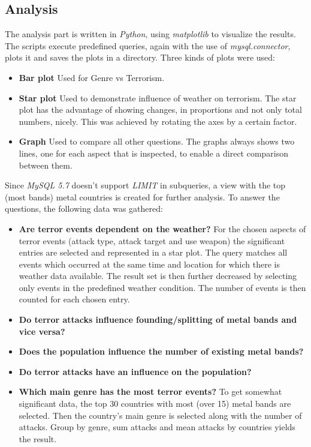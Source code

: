 \subsection{Analysis}
The analysis part is written in \emph{Python}, using \emph{matplotlib} to visualize the results. The scripts execute predefined queries, again with the use of \emph{mysql.connector}, plots it and saves the plots in a directory. Three kinds of plots were used:
\begin{itemize}
	\item \textbf{Bar plot} Used for Genre vs Terrorism.
	\item \textbf{Star plot} Used to demonstrate influence of weather on terrorism. The star plot has the advantage of showing changes, in proportions and not only total numbers, nicely. This was achieved by rotating the axes by a certain factor.
	\item \textbf{Graph} Used to compare all other questions. The graphs always shows two lines, one for each aspect that is inspected, to enable a direct comparison between them.
\end{itemize}

Since \emph{MySQL 5.7} doesn't support \emph{LIMIT} in subqueries, a view with the top (most bands) metal countries is created for further analysis. To answer the questions, the following data was gathered:
\begin{itemize}
\item \textbf{Are terror events dependent on the weather?}  For the chosen aspects of terror events (attack type, attack target and use weapon) the significant entries are selected and represented in a star plot. The query matches all events which occurred at the same time and location for which there is weather data available. The result set is then further decreased by selecting only events in the predefined weather condition. The number of events is then counted for each chosen entry.

\item \textbf{Do terror attacks influence founding/splitting of metal bands and vice versa?} 

\item \textbf{Does the population influence the number of existing metal bands?}

\item \textbf{Do terror attacks have an influence on the population?}

\item \textbf{Which main genre has the most terror events?} To get somewhat significant data, the top 30 countries with most (over 15) metal bands are selected. Then the country's main genre is selected along with the number of attacks. Group by genre, sum attacks and mean attacks by countries yields the result.
\end{itemize}



